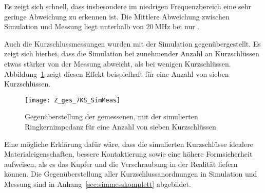 \par
Es zeigt sich schnell, dass insbesondere im niedrigen Frequenzbereich eine sehr geringe Abweichung zu erkennen ist. Die Mittlere Abweichung zwischen Simulation und Messung liegt unterhalb von $\SI{20}{\mega\hertz}$ bei nur .  
\par
Auch die Kurzschlussmessungen wurden mit der Simulation gegen\"ubergestellt. Es zeigt sich hierbei, dass die Simulation bei zunehmender Anzahl an Kurzschl\"ussen etwas st\"arker von der Messung abweicht, als bei wenigen Kurzschl\"ussen. Abbildung~\ref{fig:boxpolycrossrk7ks} zeigt diesen Effekt beispielhaft f\"ur eine Anzahl von sieben Kurzschl\"ussen.
\begin{figure}[htb]
	\centering
	\texttt{[image: Z\_ges\_7KS\_SimMeas]}
	\caption{Gegen\"uberstellung der gemessenen, mit der simulierten Ringkernimpedanz f\"ur eine Anzahl von sieben Kurzschl\"ussen}
	\label{fig:boxpolycrossrk7ks}
\end{figure}
\par
Eine m\"ogliche Erkl\"arung daf\"ur w\"are, dass die simulierten Kurzschl\"usse idealere Materialeigenschaften, bessere Kontaktierung sowie eine h\"ohere Formsicherheit aufweisen, als es das Kupfer und die Verschraubung in der Realit\"at liefern k\"onnen. Die Gegen\"uberstellung aller Kurzschlussanordnungen in Simulation und Messung sind in Anhang~\ref{sec:simmesskomplett} abgebildet.


